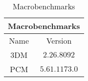 \begin{table}[H]
    \centering
    \begin{tabular}{|| c | c ||}
    \hline
    \multicolumn{2}{||c||}{Macrobenchmarks} \\ [0.5ex] \hline\hline
    Name & Version \\\hline
    3DM & $2.26.8092$ \\
    PCM & $5.61.1173.0$ \\\hline
    \end{tabular}
    \caption{Macrobenchmarks}
    \label{tab:macrobenchmarks}
\end{table}